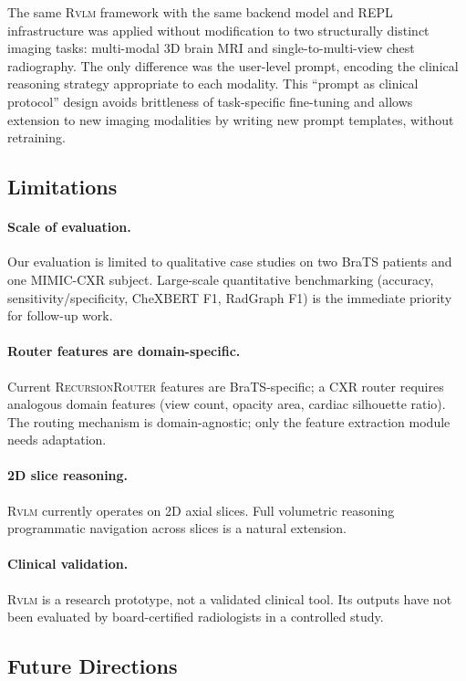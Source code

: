 \documentclass{article}
\newcommand{\RVLM}{\textsc{Rvlm}}
\newcommand{\RRouter}{\textsc{RecursionRouter}}
\begin{document}
	The same \RVLM{} framework with the same backend model and REPL
	infrastructure was applied without modification to two structurally
	distinct imaging tasks: multi-modal 3D brain MRI and single-to-multi-view
	chest radiography.
	The only difference was the user-level prompt, encoding the clinical reasoning
	strategy appropriate to each modality.
	This ``prompt as clinical protocol'' design avoids brittleness of
	task-specific fine-tuning and allows extension to new imaging modalities by
	writing new prompt templates, without retraining.
	
	\subsection{Limitations}
	
	\paragraph{Scale of evaluation.}
	Our evaluation is limited to qualitative case studies on two BraTS patients
	and one MIMIC-CXR subject.
	Large-scale quantitative benchmarking (accuracy, sensitivity/specificity,
	CheXBERT F1, RadGraph F1) is the immediate priority for follow-up work.
	
	\paragraph{Router features are domain-specific.}
	Current \RRouter{} features are BraTS-specific; a CXR router requires
	analogous domain features (view count, opacity area, cardiac silhouette
	ratio).
	The routing mechanism is domain-agnostic; only the feature extraction
	module needs adaptation.
	
	\paragraph{2D slice reasoning.}
	\RVLM{} currently operates on 2D axial slices.
	Full volumetric reasoning programmatic navigation across slices is a
	natural extension.
	
	\paragraph{Clinical validation.}
	\RVLM{} is a research prototype, not a validated clinical tool.
	Its outputs have not been evaluated by board-certified radiologists in a
	controlled study.
	
	\subsection{Future Directions}
	\label{sec:future-directions}
	
\end{document}
